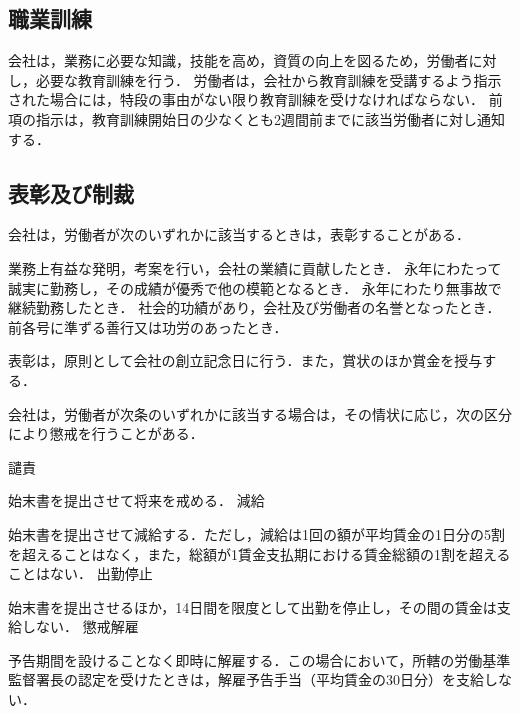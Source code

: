 \documentclass[11pt,a4paper]{jsarticle}
\begin{document}
\subsection{職業訓練}

会社は，業務に必要な知識，技能を高め，資質の向上を図るため，労働者に対し，必要な教育訓練を行う．
\term
労働者は，会社から教育訓練を受講するよう指示された場合には，特段の事由がない限り教育訓練を受けなければならない．
\term
前項の指示は，教育訓練開始日の少なくとも2週間前までに該当労働者に対し通知する．

\subsection{表彰及び制裁}

会社は，労働者が次のいずれかに該当するときは，表彰することがある．
\begin{enumerate}
	\itm 業務上有益な発明，考案を行い，会社の業績に貢献したとき．
	\itm 永年にわたって誠実に勤務し，その成績が優秀で他の模範となるとき．
	\itm 永年にわたり無事故で継続勤務したとき．
	\itm 社会的功績があり，会社及び労働者の名誉となったとき．
	\itm 前各号に準ずる善行又は功労のあったとき．
\end{enumerate}
\term
表彰は，原則として会社の創立記念日に行う．また，賞状のほか賞金を授与する．

会社は，労働者が次条のいずれかに該当する場合は，その情状に応じ，次の区分により懲戒を行うことがある．
\begin{enumerate}
	\itm 譴責\par 始末書を提出させて将来を戒める．
	\itm 減給\par 始末書を提出させて減給する．ただし，減給は1回の額が平均賃金の1日分の5割を超えることはなく，また，総額が1賃金支払期における賃金総額の1割を超えることはない．
	\itm 出勤停止\par 始末書を提出させるほか，14日間を限度として出勤を停止し，その間の賃金は支給しない．
	\itm 懲戒解雇\par 予告期間を設けることなく即時に解雇する．この場合において，所轄の労働基準監督署長の認定を受けたときは，解雇予告手当（平均賃金の30日分）を支給しない．
\end{enumerate}
\end{document}
